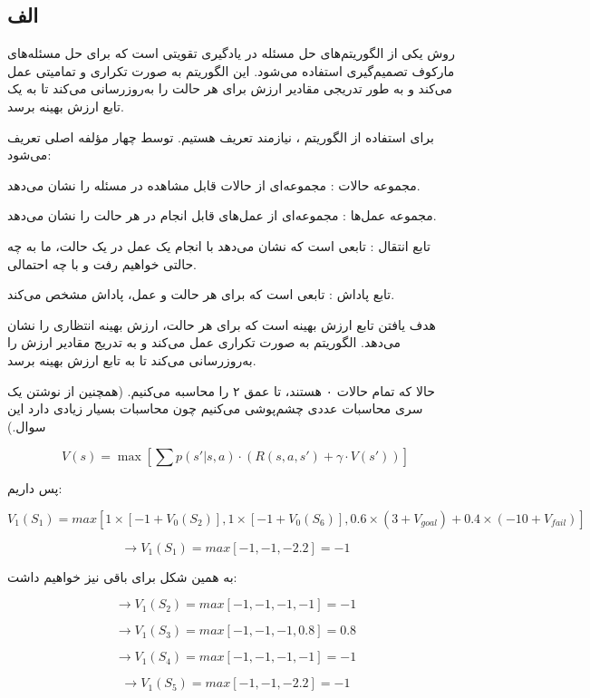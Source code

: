 \subsection*{الف}

روش
یکی از الگوریتم‌های حل مسئله در یادگیری تقویتی است که برای حل مسئله‌های مارکوف تصمیم‌گیری
استفاده می‌شود. این الگوریتم به صورت تکراری و تمامیتی عمل می‌کند و به طور تدریجی مقادیر ارزش برای هر حالت را به‌روزرسانی می‌کند تا به یک تابع ارزش بهینه برسد.

برای استفاده از الگوریتم
، نیازمند تعریف
هستیم.
توسط چهار مؤلفه اصلی تعریف می‌شود:

مجموعه حالات
:
مجموعه‌ای از حالات قابل مشاهده در مسئله را نشان می‌دهد.

مجموعه عمل‌ها 
:
مجموعه‌ای از عمل‌های قابل انجام در هر حالت را نشان می‌دهد.

تابع انتقال
:
تابعی است که نشان می‌دهد با انجام یک عمل در یک حالت، ما به چه حالتی خواهیم رفت و با چه احتمالی.

تابع پاداش
:
تابعی است که برای هر حالت و عمل، پاداش مشخص می‌کند.

هدف
یافتن تابع ارزش بهینه است که برای هر حالت، ارزش بهینه انتظاری را نشان می‌دهد. الگوریتم
به صورت تکراری عمل می‌کند و به تدریج مقادیر ارزش را به‌روزرسانی می‌کند تا به تابع ارزش بهینه برسد.

حالا که تمام حالات ۰ هستند، تا عمق ۲ را محاسبه می‌کنیم. (همچنین از نوشتن یک سری محاسبات عددی چشم‌پوشی می‌کنیم چون محاسبات بسیار زیادی دارد این سوال.)

\[ V(s) = \max \left[ \sum p(s'|s,a) \cdot \left( R(s,a,s') + \gamma \cdot V(s') \right) \right] \]

پس داریم:

$$
V_1(S_1) = max[1 \times [-1 + V_0 (S_2)] , 1 \times [-1 + V_0 (S_6)] , 0.6 \times (3 + V_{goal}) + 0.4 \times (-10 + V_{fail})]
$$

$$
\rightarrow V_1(S_1) = max[-1 , -1 , -2.2] = -1
$$

به همین شکل برای باقی نیز خواهیم داشت:

$$
\rightarrow V_1(S_2) = max[-1 , -1 , -1 , -1] = -1
$$

$$
\rightarrow V_1(S_3) = max[-1 , -1 , -1 , 0.8] = 0.8
$$

$$
\rightarrow V_1(S_4) = max[-1 , -1 , -1 , -1] = -1
$$

$$
\rightarrow V_1(S_5) = max[-1 , -1 , -2.2] = -1
$$

